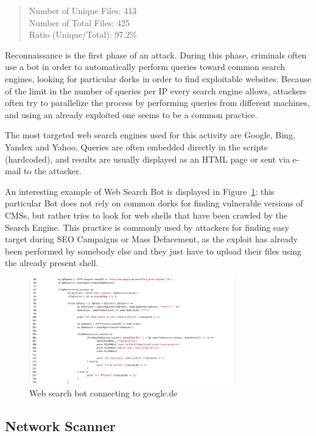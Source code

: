 \begin{quote}
Number of Unique Files: 413\\
Number of Total Files: 425\\
Ratio (Unique/Total): 97.2\%
\end{quote}

Reconnaissance is the first phase of an attack. During this phase, criminals often use a bot in order to automatically perform queries toward common search engines, looking for particular dorks in order to find exploitable websites. Because of the limit in the number of queries per IP every search engine allows, attackers often try to parallelize the process by performing queries from different machines, and using an already exploited one seems to be a common practice.

The most targeted web search engines used for this activity are Google, Bing, Yandex and Yahoo. Queries are often embedded directly in the scripts (hardcoded), and results are usually displayed as an HTML page or sent via e-mail to the attacker.

An interesting example of Web Search Bot is displayed in Figure~\ref{fig:webSearchBot}: this particular Bot does not rely on common dorks for finding vulnerable versions of CMSs, but rather tries to look for web shells that have been crawled by the Search Engine. This practice is commonly used by attackers for finding easy target during SEO Campaigns or Mass Defacement, as the exploit has already been performed by somebody else and they just have to upload their files using the already present shell.

\begin{figure}[H]
\centerline{\includegraphics[width=0.8\textwidth]{Images/webSearchBot.jpg}}
\caption{Web search bot connecting to google.de\label{fig:webSearchBot}}
\end{figure}

\subsection{Network Scanner}

